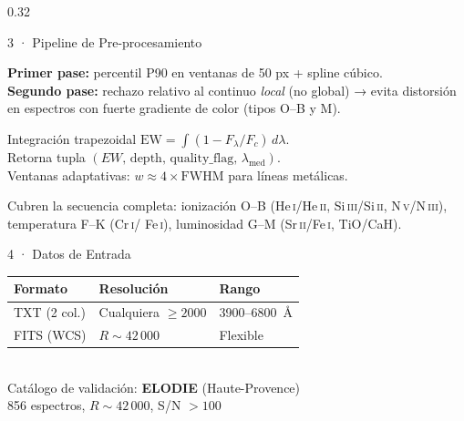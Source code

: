 \documentclass[final]{beamer}
\begin{document}
\begin{frame}[t]{}
\begin{columns}[t,totalwidth=\paperwidth]
\begin{column}{0.32\paperwidth}
\begin{block}{3 · Pipeline de Pre-procesamiento}
    \vspace{0.35cm}

    \begin{tcolorbox}[metodo={Paso 2 — Normalización al continuo (2 pasos)}]
      \textbf{Primer pase:} percentil P90 en ventanas de 50 px + spline
      cúbico.\\[4pt]
      \textbf{Segundo pase:} rechazo relativo al continuo \emph{local}
      (no global) → evita distorsión en espectros con fuerte gradiente de
      color (tipos O--B y M).
    \end{tcolorbox}

    \vspace{0.35cm}

    \begin{tcolorbox}[metodo={Paso 3 — Medición de EW (85 líneas)}]
      Integración trapezoidal $\mathrm{EW} = \int(1-F_\lambda/F_c)\,d\lambda$.\\[4pt]
      Retorna tupla $(EW,\,\mathrm{depth},\,\mathrm{quality\_flag},\,
      \lambda_\mathrm{med})$.\\[4pt]
      Ventanas adaptativas: $w \approx 4\times\mathrm{FWHM}$ para líneas
      metálicas.
    \end{tcolorbox}

    \vspace{0.35cm}

    \begin{tcolorbox}[metodo={Paso 4 — 21 Razones Diagnóstico}]
      Cubren la secuencia completa: ionización O--B
      (He\,\textsc{i}/He\,\textsc{ii}, Si\,\textsc{iii}/Si\,\textsc{ii},
      N\,\textsc{v}/N\,\textsc{iii}), temperatura F--K (Cr\,\textsc{i}/
      Fe\,\textsc{i}), luminosidad G--M (Sr\,\textsc{ii}/Fe\,\textsc{i},
      TiO/CaH).
    \end{tcolorbox}

  \end{block}

  \vspace{0.5cm}

  \begin{block}{4 · Datos de Entrada}
    \centering
    \begin{tabular}{lll}
      \toprule
      \textbf{Formato} & \textbf{Resolución} & \textbf{Rango} \\
      \midrule
      TXT (2 col.) & Cualquiera $\geq 2000$ & 3900--6800~Å \\
      FITS (WCS) & $R \sim 42\,000$ & Flexible \\
      \bottomrule
    \end{tabular}\\[0.4cm]
    Catálogo de validación: \textbf{ELODIE} (Haute-Provence)\\
    856 espectros, $R\sim42\,000$, S/N $>100$
  \end{block}


\end{column}
\end{columns}
\end{frame}
\end{document}
